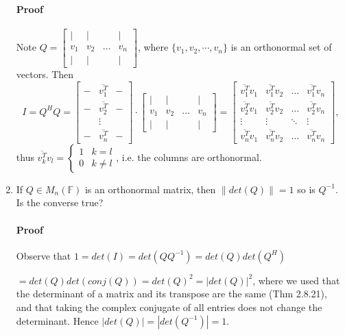 \documentclass[letterpaper,12pt]{article}
\theoremstyle{definition}
\begin{document}
\begin{enumerate}[label=(\roman*)]
\paragraph{Proof} 
Note $Q = \begin{bmatrix}
    | & | &  &  | \\
    v_{1} & v_{2} & \dots  & v_{n} \\
    |&  | &  &  | 
\end{bmatrix}$, where $\{v_1, v_2, \cdots, v_n\}$ is an orthonormal set of vectors. Then $$I = Q^HQ =  \begin{bmatrix}
    - & \overline{v_1^T}& - \\
    - & \overline{v_2^T}& - \\
     & \vdots &  \\
    - & \overline{v_n^T}& -
\end{bmatrix} \cdot 
\begin{bmatrix}
    | & | &  &  | \\
    v_{1} & v_{2} & \dots  & v_{n} \\
    |&  | &  &  | 
\end{bmatrix} 
= 
\begin{bmatrix}
    \overline{v_{1}^T} v_1 & \overline{v_{1}^T} v_2  & \dots  & \overline{v_{1}^T} v_n  \\
    \overline{v_{2}^T} v_1 & \overline{v_{2}^T} v_2  & \dots  & \overline{v_{2}^T} v_n  \\
    \vdots & \vdots  & \ddots & \vdots \\
    \overline{v_{n}^T} v_1 & \overline{v_{n}^T} v_2  & \dots  & \overline{v_{n}^T} v_n 
\end{bmatrix}
,$$
thus  $\overline{v_{k}^T} v_l 
= \begin{cases}
1 & k =  l  \\
0 & k \neq l 
\end{cases}$, i.e. the columns are orthonormal.


\item If $Q \in M_n(\mathds{F})$ is an orthonormal matrix, then $\| det(Q)\| = 1$ so is $ Q^{-1}$. Is the converse true?
\paragraph{Proof} Observe that $1 = det(I) = det(QQ^{-1}) = det(Q)det(Q^H) $ 

$= det(Q)det(conj(Q)) = det(Q)^2 = |det(Q)|^2$, where we used that the determinant of a matrix and its transpose are the same (Thm 2.8.21), and  that taking the complex conjugate of all entries does not change the determinant.  Hence $|det(Q)| = |det(Q^{-1})| = 1 .$


\end{enumerate}
\end{document}
